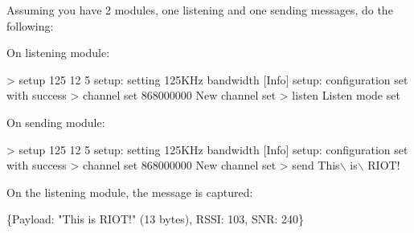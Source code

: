 Assuming you have 2 modules, one listening and one sending messages, do the following\+:
\begin{DoxyItemize}
\item On listening module\+: 
\begin{DoxyCode}
> setup 125 12 5
setup: setting 125KHz bandwidth
[Info] setup: configuration set with success
> channel set 868000000
New channel set
> listen
Listen mode set
\end{DoxyCode}

\item On sending module\+: 
\begin{DoxyCode}
> setup 125 12 5
setup: setting 125KHz bandwidth
[Info] setup: configuration set with success
> channel set 868000000
New channel set
> send This\(\backslash\) is\(\backslash\) RIOT!
\end{DoxyCode}

\end{DoxyItemize}

On the listening module, the message is captured\+: 
\begin{DoxyCode}
\{Payload: "This is RIOT!" (13 bytes), RSSI: 103, SNR: 240\}
\end{DoxyCode}
 